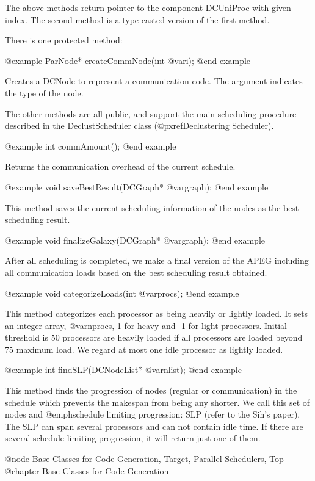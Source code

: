 The above methods return pointer to the component DCUniProc with given index.
The second method is a type-casted version of the first method.

There is one protected method:

@example
ParNode* createCommNode(int @var{i});
@end example

Creates a DCNode to represent a communication code. The argument indicates
the type of the node.

The other methods are all public, and support the main scheduling procedure
described in the DeclustScheduler class (@pxref{Declustering Scheduler}).

@example
int commAmount();
@end example

Returns the communication overhead of the current schedule.

@example
void saveBestResult(DCGraph* @var{graph});
@end example

This method saves the current scheduling information of the nodes as the best
scheduling result.

@example
void finalizeGalaxy(DCGraph* @var{graph});
@end example

After all scheduling is completed, we make a final version of the APEG
including all communication loads based on the best scheduling result
obtained.

@example
void categorizeLoads(int @var{procs});
@end example

This method categorizes each processor as being heavily or lightly loaded.
It sets an integer array, @var{nprocs}, 1 for heavy and -1 for light
processors. Initial threshold is 50%
processors are heavily loaded if all processors are loaded beyond 75%
maximum load. We regard at most one idle processor as lightly loaded. 

@example
int findSLP(DCNodeList* @var{nlist});
@end example

This method finds the progression of nodes (regular or communication)
in the schedule which prevents the makespan from being any shorter. We call
this set of nodes and @emph{schedule limiting progression: SLP} (refer to
the Sih's paper). The SLP can span several processors and can not contain
idle time. If there are several schedule limiting progression, it will
return just one of them.

@node Base Classes for Code Generation, Target, Parallel Schedulers, Top
@chapter Base Classes for Code Generation

